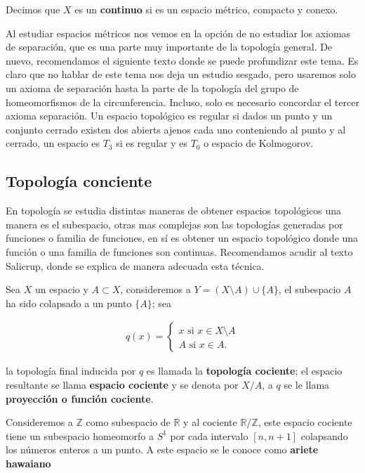 \begin{df}
Decimos que $X$ es un \textbf{continuo} si es un espacio métrico, compacto y conexo.
\end{df}

Al estudiar espacios métricos nos vemos en la opción de no estudiar los axiomas de separación, que es una parte muy importante de la topología general. De nuevo, recomendamos el siguiente texto donde se puede profundizar este tema. Es claro que no hablar de este tema nos deja un estudio sesgado, pero usaremos solo un axioma de separación hasta la parte de la topología del grupo de homeomorfismos de la circunferencia. Incluso, solo es necesario concordar el tercer axioma separación. Un espacio topológico es regular si dados un punto y un conjunto cerrado existen dos abierts ajenos cada uno conteniendo al punto y al cerrado, un espacio es $T_3$ si es regular y es $T_0$ o espacio de Kolmogorov. 


\subsection*{Topología conciente}

En topología se estudia distintas maneras de obtener espacios topológicos una manera es el subespacio, otras mas complejas son las topologías generadas por funciones o familia de funciones, en sí es obtener un espacio topológico donde una función o una familia de funciones son continuas. Recomendamos acudir al texto Salicrup, donde se explica de manera adecuada esta técnica. 

Sea $X$ un espacio y $A \subset X$, consideremos a $Y=(X\setminus A) \cup \{A\}$, el subespacio $A$ ha sido colapsado a un punto $\{A\}$; sea

\begin{align*}
q(x)= \begin{cases}
x \text{ si } x \in X\setminus A \\
A \text{ si } x \in A.
\end{cases}
\end{align*}

la topología final inducida por $q$ es llamada la \textbf{topología cociente}; el espacio resultante se llama \textbf{espacio cociente} y se denota por $X/A$, a $q$ se le llama \textbf{proyección o función cociente}.

\begin{ej}
Consideremos a $\mathbb{Z}$ como subespacio de $\mathbb{R}$ y al cociente $\mathbb{R}/\mathbb{Z}$, este espacio cociente tiene un subespacio homeomorfo a $S^1$ por cada intervalo $[n,n+1]$ colapsando los números enteros a un punto. A este espacio se le conoce como \textbf{ariete hawaiano}
\end{ej}

